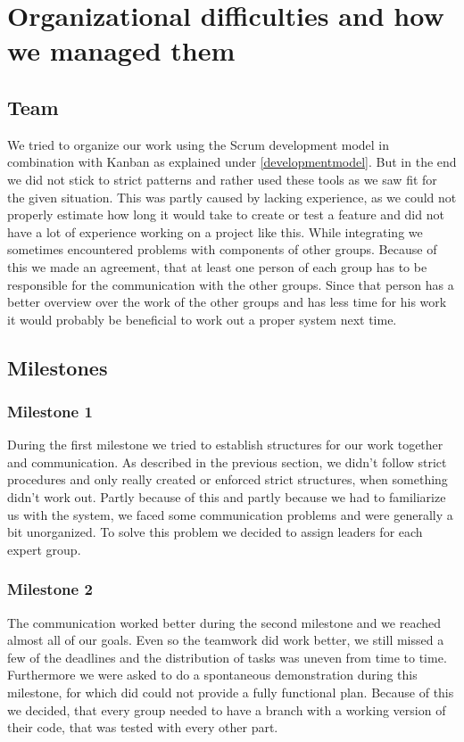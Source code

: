 \documentclass[main.tex]{subfiles}
\begin{document}
	\begingroup

	\renewcommand{\cleardoublepage}{}

	\renewcommand{\clearpage}{}

	\chapter{Organizational difficulties and how we managed them}

		
		\section{Team}
		We tried to organize our work using the Scrum development model in combination with Kanban as explained under \ref{developmentmodel}. But in the end we did not stick to strict patterns and rather used these tools as we saw fit for the given situation. This was partly caused by lacking experience, as we could not properly estimate how long it would take to create or test a feature and did not have a lot of experience working on a project like this.
		While integrating we sometimes encountered problems with components of other groups. Because of this we made an agreement, that at least one person of each group has to be responsible for the communication with the other groups. Since that person has a better overview over the work of the other groups and has less time for his work it would probably be beneficial to work out a proper system next time.
		
		\section{Milestones}
		
		\subsection{Milestone 1}
		During the first milestone we tried to establish structures for our work together and communication. As described in the previous section, we didn't follow strict procedures and only really created or enforced strict structures, when something didn't work out. Partly because of this and partly because we had to familiarize us with the system, we faced some communication problems and were generally a bit unorganized. To solve this problem we decided to assign leaders for each expert group.
		
		\subsection{Milestone 2}
		The communication worked better during the second milestone and we reached almost all of our goals. Even so the teamwork did work better, we still missed a few of the deadlines and the distribution of tasks was uneven from time to time. Furthermore we were asked to do a spontaneous demonstration during this milestone, for which did could not provide a fully functional plan. Because of this we decided, that every group needed to have a branch with a working version of their code, that was tested with every other part.
		
\end{document}

